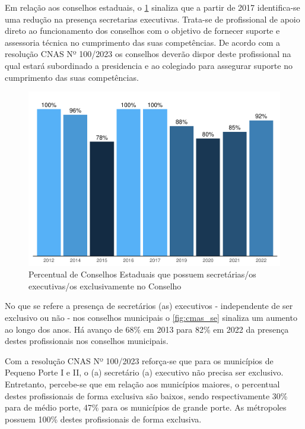 \documentclass[
  brazilian]{report}
\begin{document}
Em relação aos conselhos estaduais, o \cref{fig:ceas_se} sinaliza que a
partir de 2017 identifica-se uma redução na presença secretarias
executivas. Trata-se de profissional de apoio direto ao funcionamento
dos conselhos com o objetivo de fornecer suporte e assessoria técnica no
cumprimento das suas competências. De acordo com a resolução CNAS Nº
100/2023 os conselhos deverão dispor deste profissional na qual estará
subordinado a presidencia e ao colegiado para assegurar suporte no
cumprimento das suas competências.

\begin{figure}
\includegraphics{Censo-SUAS-2022_files/figure-latex/ceas_se-1} \caption[Percentual de Conselhos Estaduais que possuem secretárias/os executivas/os exclusivamente no Conselho]{Percentual de Conselhos Estaduais que possuem secretárias/os executivas/os exclusivamente no Conselho}\label{fig:ceas_se}
\end{figure}

No que se refere a presença de secretários (as) executivos -
independente de ser exclusivo ou não - nos conselhos municipais o
\cref{fig:cmas_se} sinaliza um aumento ao longo dos anos. Há avanço de
68\% em 2013 para 82\% em 2022 da presença destes profissionais nos
conselhos municipais.

Com a resolução CNAS Nº 100/2023 reforça-se que para os municípios de
Pequeno Porte I e II, o (a) secretário (a) executivo não precisa ser
exclusivo. Entretanto, percebe-se que em relação aos municípios maiores,
o percentual destes profissionais de forma exclusiva são baixos, sendo
respectivamente 30\% para de médio porte, 47\% para os municípios de
grande porte. As métropoles possuem 100\% destes profissionais de forma
exclusiva.
\end{document}

